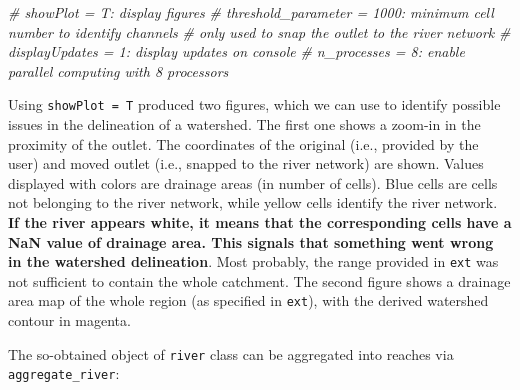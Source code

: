 \documentclass[
]{article}
\newenvironment{Shaded}{\begin{snugshade}}{\end{snugshade}}
\newcommand{\CommentTok}[1]{\textcolor[rgb]{0.56,0.35,0.01}{\textit{#1}}}
\begin{document}
\begin{Shaded}
\begin{Highlighting}[]
\CommentTok{\# showPlot = T: display figures}
\CommentTok{\# threshold\_parameter = 1000: minimum cell number to identify channels}
\CommentTok{\#                             only used to snap the outlet to the river network}
\CommentTok{\# displayUpdates = 1: display updates on console}
\CommentTok{\# n\_processes = 8: enable parallel computing with 8 processors}
\end{Highlighting}
\end{Shaded}

Using \texttt{showPlot\ =\ T} produced two figures, which we can use to identify possible issues in the delineation of a watershed. The first one shows a zoom-in in the proximity of the outlet. The coordinates of the original (i.e., provided by the user) and moved outlet (i.e., snapped to the river network) are shown. Values displayed with colors are drainage areas (in number of cells). Blue cells are cells not belonging to the river network, while yellow cells identify the river network. \textbf{If the river appears white, it means that the corresponding cells have a NaN value of drainage area. This signals that something went wrong in the watershed delineation}. Most probably, the range provided in \texttt{ext} was not sufficient to contain the whole catchment. The second figure shows a drainage area map of the whole region (as specified in \texttt{ext}), with the derived watershed contour in magenta.

The so-obtained object of \texttt{river} class can be aggregated into reaches via \texttt{aggregate\_river}:
\end{document}
